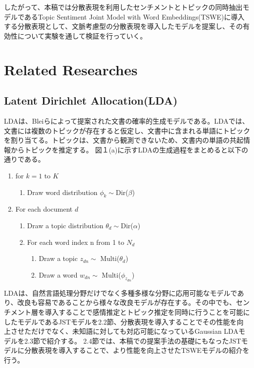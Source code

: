 \documentclass[uplatex]{jsarticle}
\begin{document}
したがって、本稿では分散表現を利用したセンチメントとトピックの同時抽出モデルであるTopic Sentiment Joint Model with Word Embeddings(TSWE)に導入する分散表現として、文脈考慮型の分散表現を導入したモデルを提案し、その有効性について実験を通して検証を行っていく。

\section{Related Researches}
\subsection{Latent Dirichlet Allocation(LDA)}
LDAは、Bleiら\cite{LDA}によって提案された文書の確率的生成モデルである。LDAでは、文書には複数のトピックが存在すると仮定し、文書中に含まれる単語にトピックを割り当てる。トピックは、文書から観測できないため、文書内の単語の共起情報からトピックを推定する。
図１(a)に示すLDAの生成過程をまとめると以下の通りである。
\begin{enumerate}
    \item for $k=1$ to $K$
          \begin{enumerate}
              \item Draw word distribution $\phi_{k} \sim $Dir($\beta$)
          \end{enumerate}
    \item For each document $d$
          \begin{enumerate}
              \item Draw a topic distribution $\theta_{d} \sim $Dir($\alpha$)
              \item For each word index n from 1 to $N_{d}$
                    \begin{enumerate}
                        \item Draw a topic $z_{dn} \sim$ Multi($\theta_{d}$)
                        \item Draw a word $w_{dn} \sim$ Multi($\phi_{z_{dn}}$)
                    \end{enumerate}
          \end{enumerate}
\end{enumerate}

LDAは、自然言語処理分野だけでなく多種多様な分野に応用可能なモデルであり、改良も容易であることから様々な改良モデルが存在する。その中でも、センチメント層を導入することで感情推定とトピック推定を同時に行うことを可能にしたモデルであるJST\cite{JST}モデルを2.2節、分散表現を導入することでその性能を向上させただけでなく、未知語に対しても対応可能になっているGaussian LDA\cite{Gaussian LDA}モデルを2.3節で紹介する。
2.4節では、本稿での提案手法の基礎にもなったJSTモデルに分散表現を導入することで、より性能を向上させたTSWE\cite{TSWE}モデルの紹介を行う。
\end{document}
